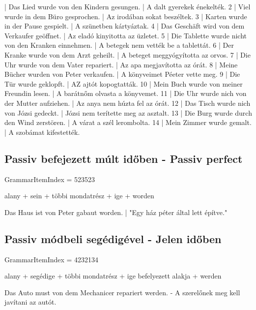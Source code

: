 \documentclass{article}
\newenvironment{desc}{\verbatim}{\endverbatim}
\newenvironment{exmp}{\verbatim}{\endverbatim}
\begin{document}
\begin{exmp}
1 | Das Lied wurde von den Kindern gesungen. | A dalt gyerekek énekelték.
2 | Viel wurde in dem Büro gesprochen. | Az irodában sokat beszéltek.
3 | Karten wurde in der Pause gespielt. | A szünetben kártyáztak.
4 | Das Geschäft wird von dem Verkaufer geöffnet. | Az eladó kinyitotta az üzletet.
5 | Die Tablette wurde nicht von den Kranken einnehmen. | A betegek nem vették be a tablettát.
6 | Der Kranke wurde von dem Arzt geheilt. | A beteget meggyógyította az orvos.
7 | Die Uhr wurde von dem Vater repariert. | Az apa megjavította az órát.
8 | Meine Bücher wurden von Peter verkaufen. | A könyveimet Péeter vette meg.
9 | Die Tür wurde geklopft. | AZ ajtót kopogtatták.
10 | Mein Buch wurde von meiner Freundin lesen. | A barátnőm olvasta a könyvemet.
11 | Die Uhr wurde nich von der Mutter aufziehen. | Az anya nem húzta fel az órát.
12 | Das Tisch wurde nich von Józsi gedeckt. | Józsi nem terítette meg az asztalt.
13 | Die Burg wurde durch den Wind zerstören. | A várat a szél lerombolta.
14 | Mein Zimmer wurde gemalt. | A szobámat kifestették.
\end{exmp}

\subsection{Passiv befejezett múlt időben - Passiv perfect}

GrammarItemIndex = 523523

\begin{desc}
alany + sein + többi mondatrész + ige + worden

Das Haus ist von Peter gabaut worden. | "Egy ház péter által lett építve."
\end{desc}

\subsection{Passiv módbeli segédigével - Jelen időben}

GrammarItemIndex = 4232134

\begin{desc}
alany + segédige + többi mondatrész + ige befelyezett alakja + werden

Das Auto must von dem Mechanicer repariert werden. - A szerelőnek meg kell javítani az autót.
\end{desc}
\end{document}
